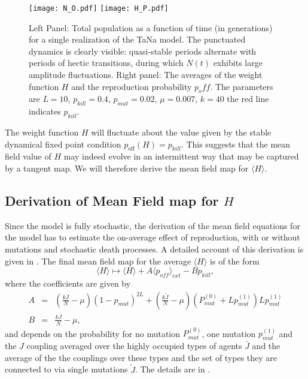 \documentclass[12pt]{article}
\begin{document}
\begin{figure}[ht!]
\centering
\texttt{[image: N\_O.pdf]}%
\texttt{[image: H\_P.pdf]}%
\caption{Left Panel: Total population as a function of time (in generations) for a single realization of the TaNa model. The punctuated dynamics is clearly visible: quasi-stable periods alternate with periods of hectic transitions, during which $N(t)$ exhibits large amplitude fluctuations. Right panel: The averages of the weight function $H$ and the reproduction probability $p_off$. The parameters are $L = 10$, $p_{kill}  = 0.4$, $p_{mut} = 0.02$, $\mu  = 0.007$, $k = 40$ the red line indicates $p_{kill}$.}
\label{fig:1}
\end{figure}

The weight function $H$ will fluctuate about the value given by the stable dynamical fixed point condition $p_\text{off}(H)=p_{kill}$. This suggests that the mean field value of $H$ may indeed evolve in an intermittent way that may be captured by a tangent map. We will therefore derive the mean field map for $\langle H\rangle$. 
  
\subsection*{Derivation of Mean Field map for $H$}  
Since the model is fully stochastic, the derivation of the mean field equations for the model has to estimate the on-average effect of reproduction, with or without mutations and stochastic death processes. A detailed account of this derivation is given in \cite{ADR_HJJ_DP_AR1}. The final mean field map for the average $\langle H\rangle$ is of the form 
\begin{equation}
	\langle H\rangle \mapsto  \langle H\rangle +A\langle p_{off}\rangle_{ext}	
	-   B p_{kill},
	\label{TaNa_mf_map1}
\end{equation}
	where the coefficients are given by	
\begin{eqnarray}
	A &=& \left(\frac{k\bar{J}}{N}-\mu\right)(1-p_{mut})^{2L}+\left(\frac{k\tilde{J}}{N}-\mu\right)(P^{(0)}_{mut}+Lp^{(1)}_{mut})Lp^{(1)}_{mut}
	\label{A_cof}\\
	B &=& \frac{k\bar{J}}{N}-\mu,
\end{eqnarray}
and depends on the probability for no mutation $P^{(0)}_{mut}$, one mutation $p^{(1)}_{mut}$ and the $J$ coupling averaged over the highly occupied types of agents ${\bar J}$ and the average of the the couplings over these types and the set of types they are connected to via single mutations $\tilde{J}$. The details are in \cite{ADR_HJJ_DP_AR1}.
\end{document}
